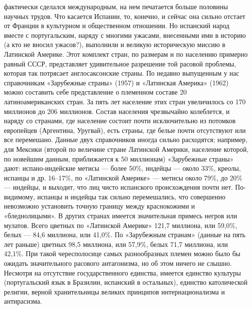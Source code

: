 фактически сделался международным, на нем печатается больше половины научных
трудов. Что касается Испании, то, конечно, и сейчас она сильно отстает от
Франции в культурном и общественном отношении. Но испанский народ вместе с
португальским, наряду с многими ужасами, внесенными ими в историю (а кто не
вносил ужасов?), выполнили и великую историческую миссию в Латинской Америке.
Этот комплект стран, по размерам и по населению примерно равный СССР,
представляет удивительное разрешение той расовой проблемы, которая так
потрясает англосаксонские страны. По недавно выпущенным у нас справочникам
«Зарубежные страны» (1957) и «Латинская Америка» (1962) можно составить себе
представление о племенном составе 20 латиноамериканских стран. За пять лет
население этих стран увеличилось со 170 миллионов до 206 миллионов. Состав
населения чрезвычайно колеблется, и наряду со странами, где население состоит
почти исключительно из потомков европейцев (Аргентина, Уругвай), есть страны,
где белые почти отсутствуют или все перемешано. Данные двух справочников иногда
сильно расходятся; например, для Мексики (второй по величине стране Латинской
Америки, население которой, по новейшим данным, приближается к 50 миллионам)
«Зарубежные страны» дают: испано-индейские метисы --- более 50\%, индейцы --- около
33\%, креолы, испанцы и др. 16--17\%, по «Латинской Америке» --- метисы около 79\%,
до 20\% --- индейцы, и выходит, что лиц чисто испанского происхождения почти нет.
По-видимому, испанцы и индейцы так сильно перемешались, что совершенно
невозможно установить точную границу между краснокожими и «бледнолицыми». В
других странах имеется значительная примесь негров или мулатов. Всего цветных
по «Латинской Америке» 121,7 миллиона, или 59,0\%, белых --- 84,6 миллиона, или
41,0\%. По «Зарубежным странам» (данные на пять лет раньше) цветных 98,5
миллиона, или 57,9\%, белых 71,7 миллиона, или 42,1\%. При такой чересполосице
самых разнообразных племен можно было бы ожидать значительного расового
антагонизма, но об этом ничего не слышно. Несмотря на отсутствие
государственного единства, имеется единство культуры (португальский язык в
Бразилии, испанский в остальных), единство католической религии, верной
хранительницы великих принципов интернационализма и антирасизма.

